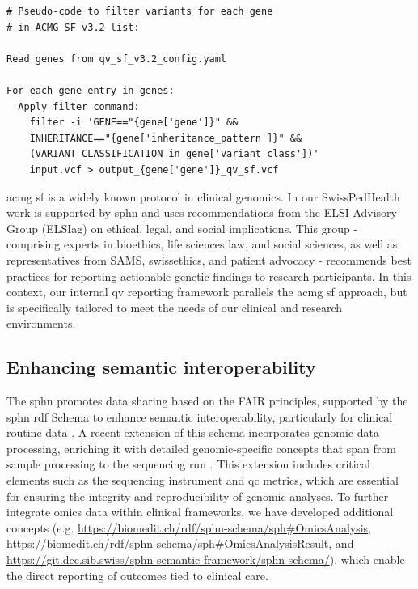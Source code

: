 \begin{tcolorbox}[
    breakable,  %
    colback=white!0,  %
    colframe=black,  %
    boxrule=1pt,  %
    arc=1mm,  %
    outer arc=1mm,
    title=\textbf{\refstepcounter{myboxcounter}\label{box:qv_variables_example_sf2}Box \themyboxcounter: Filtering command for QV SF}
]
\begin{verbatim}
# Pseudo-code to filter variants for each gene 
# in ACMG SF v3.2 list:

Read genes from qv_sf_v3.2_config.yaml

For each gene entry in genes:
  Apply filter command:
    filter -i 'GENE=="{gene['gene']}" && 
    INHERITANCE=="{gene['inheritance_pattern']}" && 
    (VARIANT_CLASSIFICATION in gene['variant_class'])' 
    input.vcf > output_{gene['gene']}_qv_sf.vcf
\end{verbatim}
\end{tcolorbox}

\ac{acmg} \ac{sf} is a widely known protocol in clinical genomics. 
In our SwissPedHealth work is supported by \ac{sphn} and uses recommendations from the ELSI Advisory Group (ELSIag) on ethical, legal, and social implications. 
This group - comprising experts in bioethics, life sciences law, and social sciences, as well as representatives from SAMS, swissethics, and patient advocacy - recommends best practices for reporting actionable genetic findings to research participants.
In this context, our internal \ac{qv} reporting framework parallels the \ac{acmg} \ac{sf} approach, but is specifically tailored to meet the needs of our clinical and research environments.

\subsection{Enhancing semantic interoperability}
\label{semantic}
The \ac{sphn} promotes data sharing based on the FAIR principles, supported by the \ac{sphn} \ac{rdf} Schema to enhance semantic interoperability, particularly for clinical routine data \cite{wilkinson2016fair, toure2023fairification}. 
A recent extension of this schema incorporates genomic data processing, enriching it with detailed genomic-specific concepts that span from sample processing to the sequencing run \cite{van2023bridging}. 
This extension includes critical elements such as the sequencing instrument and \ac{qc} metrics, which are essential for ensuring the integrity and reproducibility of genomic analyses. 
To further integrate omics data within clinical frameworks, we have developed additional concepts (e.g. \url{https://biomedit.ch/rdf/sphn-schema/sph#OmicsAnalysis}, \url{https://biomedit.ch/rdf/sphn-schema/sph#OmicsAnalysisResult}, and \\ \url{https://git.dcc.sib.swiss/sphn-semantic-framework/sphn-schema/}), which enable the direct reporting of outcomes tied to clinical care.

